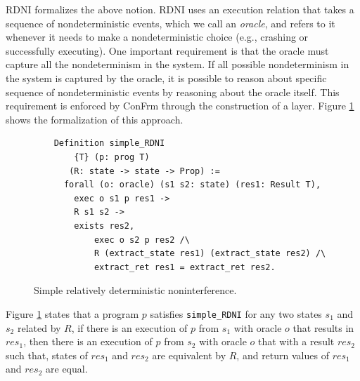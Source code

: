 RDNI formalizes the above notion. RDNI uses an execution relation that takes a sequence of nondeterministic events, which we call an \emph{oracle}, and refers to it whenever it needs to make a nondeterministic choice (e.g., crashing or successfully executing). One important requirement is that the oracle must capture all the nondeterminism in the system. If all possible nondeterminism in the system is captured by the oracle, it is possible to reason about specific sequence of nondeterministic events by reasoning about the oracle itself. This requirement is enforced by ConFrm through the construction of a layer. Figure \ref{fig:RDNI_no_recovery} shows the formalization of this approach.

\begin{figure}[H]
    \centering
    \begin{verbatim}
    Definition simple_RDNI
        {T} (p: prog T)
       (R: state -> state -> Prop) :=
      forall (o: oracle) (s1 s2: state) (res1: Result T),
        exec o s1 p res1 ->
        R s1 s2 ->
        exists res2, 
            exec o s2 p res2 /\
            R (extract_state res1) (extract_state res2) /\
            extract_ret res1 = extract_ret res2.
    \end{verbatim}
    \caption{Simple relatively deterministic noninterference.}
    \label{fig:RDNI_no_recovery}
\end{figure}

Figure \ref{fig:RDNI_no_recovery} states that a program $p$ satisfies \texttt{simple\_RDNI} for any two states $s_1$ and $s_2$ related by $R$, if there is an execution of $p$ from $s_1$ with oracle $o$ that results in $res_1$, then there is an execution of $p$ from $s_2$ with oracle $o$ that with a result $res_2$ such that, states of $res_1$ and $res_2$ are equivalent by $R$, and return values of $res_1$ and $res_2$ are equal.

